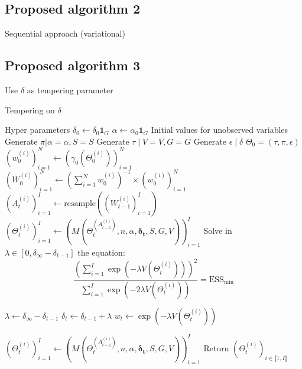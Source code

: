 \documentclass{article}
\begin{document}
\subsection{Proposed algorithm 2}
Sequential approach (variational)
\subsection{Proposed algorithm 3}
Use $\delta$ as tempering parameter


\begin{algorithm}[H]
\caption{ Tempering on $\delta$}
\begin{algorithmic}

\State Hyper parameters
\Indent
\State $\delta_0\gets \delta_0 \mathds{1}_G$
\State $\alpha\gets \alpha_0\mathds{1}_G$ 
\EndIndent
\State Initial values for unobserved variables
\Indent
\State Generate $\pi|\alpha=\alpha,S=S$ 
\State Generate $\tau\mid V=V,G=G$
\State Generate $\epsilon\mid\delta$
\State $\Theta_0=(\tau,\pi,\epsilon)$
\State $(w_0^{(i)})_{i=1}^N\gets \left(\gamma_0(\Theta_0^{(i)})\right)_{i=1}^N$
\State $(W_0^{(i)})_{i=1}^N\gets \left(\sum_{i=1}^N w_0^{(i)}\right)^{-1}\times \left(w_0^{(i)}\right)_{i=1}^N$
\EndIndent
\EndStep
{}
        \State $\left(A_{t}^{(i)}\right)_{i=1}^I\gets \mathrm{resample}\left(\left(W_{t-1}^{(i)}\right)_{i=1}^I\right)$
         \State $\left(\Theta_{t}^{(i)}\right)_{i=1}^I\gets \left(M\left(\Theta_{t}^{(A_{t-1}^{(i)})},n,\alpha,\mathbf{\delta_t},S,G,V\right)\right)_{i=1}^I$
\State Solve in $\lambda\in[0,\delta_\infty-\delta_{t-1}]$ the equation: 
 $$\frac{\left(\sum_{i=1}^I\exp\left(-\lambda V(\Theta_t^{(i)})\right)\right)^2}{\sum_{i=1}^I\exp\left(-2\lambda V(\Theta_t^{(i)})\right)}=\mathrm{ESS}_{\mathrm{min}}$$

\State $\lambda\gets\delta_\infty-\delta_{t-1}$
\EndIf
\State $\delta_t\gets \delta_{t-1}+\lambda$
\State $w_t\gets \exp\left(-\lambda V(\Theta_t^{(i)})\right)$

\EndWhile
    \State $\left(\Theta_{t}^{(i)}\right)_{i=1}^I\gets \left(M\left(\Theta_{t}^{(A_{t-1}^{(i)})},n,\alpha,\mathbf{\delta_t},S,G,V\right)\right)_{i=1}^I$
\EndFor    
\EndStep
Return $\left(\Theta_{t}^{(i)}\right)_{i\in\llbracket 1,I\rrbracket}$
\EndProcedure
\end{algorithmic}
\end{algorithm}
\end{document}

